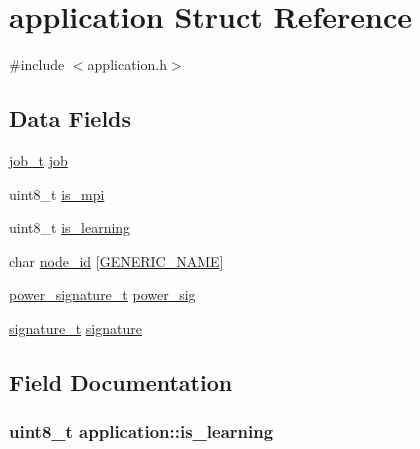 \hypertarget{structapplication}{}\section{application Struct Reference}
\label{structapplication}


{\ttfamily \#include $<$application.\+h$>$}

\subsection*{Data Fields}
\begin{DoxyCompactItemize}
\item 
\hyperlink{job_8h_aa728c8658fca10fa053b983ab92efb2f}{job\+\_\+t} \hyperlink{structapplication_a6d563fcc9d9458ed7cf89f84c8251fc1}{job}
\item 
uint8\+\_\+t \hyperlink{structapplication_a4501cc16e6157433ae7362d924562ec8}{is\+\_\+mpi}
\item 
uint8\+\_\+t \hyperlink{structapplication_a1bc8bcfea9b32948bbf940494388a4ae}{is\+\_\+learning}
\item 
char \hyperlink{structapplication_ace5ff39d996de45eaae623d1b9b5d018}{node\+\_\+id} \mbox{[}\hyperlink{loop_8h_a6b0b8b14cfc75447be8feba3efe18da8}{G\+E\+N\+E\+R\+I\+C\+\_\+\+N\+A\+ME}\mbox{]}
\item 
\hyperlink{power__signature_8h_a480837ae8c8a296ce593d1c3d898c464}{power\+\_\+signature\+\_\+t} \hyperlink{structapplication_a0f37d24761a458af718e3e4c7d19be46}{power\+\_\+sig}
\item 
\hyperlink{signature_8h_a3387c90f9aa9243c926866ee8ce61917}{signature\+\_\+t} \hyperlink{structapplication_a88f30e4f12137cd152c91a9d494a763d}{signature}
\end{DoxyCompactItemize}


\subsection{Field Documentation}
\subsubsection[{\texorpdfstring{is\+\_\+learning}{is_learning}}]{\setlength{\rightskip}{0pt plus 5cm}uint8\+\_\+t application\+::is\+\_\+learning}\hypertarget{structapplication_a1bc8bcfea9b32948bbf940494388a4ae}{}\label{structapplication_a1bc8bcfea9b32948bbf940494388a4ae}
